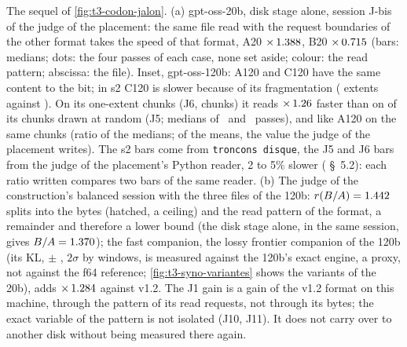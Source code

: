   {The sequel of \cref{fig:t3-codon-jalon}. (a) gpt-oss-20b, disk stage alone, session J-bis of the judge of the
   placement: the same file read with the request boundaries of the other format takes the speed of that format,
   A20 $\times\,\CodonNum{\CodonNMotifRA}$, B20 $\times\,\CodonNum{\CodonNMotifRB}$ (bars: medians; dots: the four
   passes of each case, none set aside; colour: the read pattern; abscissa: the file). Inset, gpt-oss-120b: A120
   and C120 have the same content to the bit; in s2 C120 is slower because of its fragmentation
   (\CodonNum{\CodonNExtentsC} extents against \CodonNum{\CodonNExtentsA}). On its one-extent chunks (J6,
   \CodonNum{\CodonNEncartTiresJsix} chunks) it reads $\times\,\CodonNum{\CodonNEncartFrag}$ faster than on
   \CodonNum{\CodonNEncartTiresJcinq} of its chunks drawn at random (J5; medians of \CodonNEncartPassesJcinq\ and
   \CodonNEncartPassesJsix\ passes), and like A120 on the same chunks (ratio \CodonNum{\CodonNEncartCsurA} of the
   medians; \CodonNum{\CodonNEncartCsurAMoy} of the means, the value the judge of the placement writes). The s2 bars
   come from \texttt{troncons disque}, the J5 and J6 bars from the judge of the placement's Python reader, 2 to 5\%
   slower ( §~5.2): each ratio written compares two bars of the same reader.
   (b) The judge of the construction's balanced session with the three files of the 120b:
   $r(B/A)=\CodonNum{\CodonNCascRBA}$ splits into the bytes (hatched, a ceiling) and the read pattern of the format,
   a remainder and therefore a lower bound (the disk stage alone, in the same session, gives
   $B/A=\CodonNum{\CodonNCascDisqueBA}$); the fast companion, the lossy frontier companion of the 120b (its KL,
   \CodonNum{\CodonNCompagnonKL} $\pm$ \CodonNum{\CodonNCompagnonDeuxSigma}, $2\sigma$ by windows, is measured
   against the 120b's exact engine, a proxy, not against the f64 reference; \cref{fig:t3-syno-variantes} shows the
   variants of the 20b), adds $\times\,\CodonNum{\CodonNCascRRB}$ against v1.2. The J1 gain is a
   gain of the v1.2 format on this machine, through the pattern of its read requests, not through its bytes; the
   exact variable of the pattern is not isolated (J10, J11). It does not carry over to another disk without being
   measured there again.}

